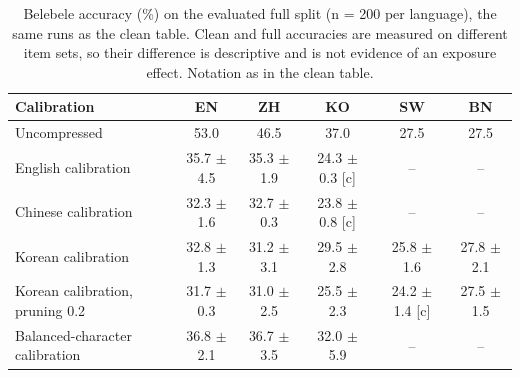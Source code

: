 \begin{table}[t]
\centering
\small
\begin{tabular}{lccccc}
\toprule
Calibration & EN & ZH & KO & SW & BN \\
\midrule
Uncompressed & 53.0 & 46.5 & 37.0 & 27.5 & 27.5 \\
English calibration & 35.7 $\pm$ 4.5 & 35.3 $\pm$ 1.9 & 24.3 $\pm$ 0.3 [c] & -- & -- \\
Chinese calibration & 32.3 $\pm$ 1.6 & 32.7 $\pm$ 0.3 & 23.8 $\pm$ 0.8 [c] & -- & -- \\
Korean calibration & 32.8 $\pm$ 1.3 & 31.2 $\pm$ 3.1 & 29.5 $\pm$ 2.8 & 25.8 $\pm$ 1.6 & 27.8 $\pm$ 2.1 \\
Korean calibration, pruning 0.2 & 31.7 $\pm$ 0.3 & 31.0 $\pm$ 2.5 & 25.5 $\pm$ 2.3 & 24.2 $\pm$ 1.4 [c] & 27.5 $\pm$ 1.5 \\
Balanced-character calibration & 36.8 $\pm$ 2.1 & 36.7 $\pm$ 3.5 & 32.0 $\pm$ 5.9 & -- & -- \\
\bottomrule
\end{tabular}
\caption{Belebele accuracy (\%) on the evaluated full split (n = 200 per language), the same runs as the clean table. Clean and full accuracies are measured on different item sets, so their difference is descriptive and is not evidence of an exposure effect. Notation as in the clean table.}
\label{tab:belebele-full}
\end{table}
